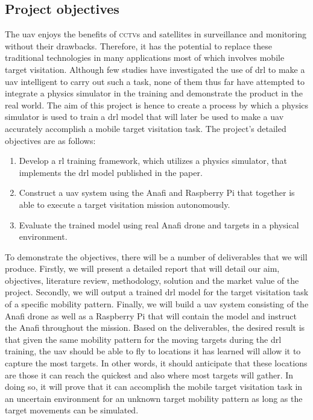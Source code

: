 \documentclass[../main.tex]{subfiles}
\begin{document}

\subsection{Project objectives}\label{sec:objectives}

The \gls{uav} enjoys the benefits of \textsc{cctv}s and satellites
in surveillance and monitoring without their drawbacks.
Therefore, it has the potential to replace these
traditional technologies in many applications 
most of which involves mobile target visitation. 
Although few studies have investigated the use of \gls{drl}
to make a \gls{uav} intelligent to carry out such a task,
none of them thus far have attempted to
integrate a physics simulator in the training
and demonstrate the product in the real world.
The aim of this project is hence to create a process 
by which a physics simulator is used to train 
a \gls{drl} model that will later be used
to make a \gls{uav} accurately accomplish a
mobile target visitation task.
The project's detailed objectives are as follows:

\begin{enumerate}
    \item Develop a \gls{rl} training framework,
        which utilizes a physics simulator, 
        that implements the \gls{drl} model 
        published in the \textcite{Ged21} paper.
    \item Construct a \gls{uav} system using the Anafi and 
        Raspberry Pi that together is able to execute
        a target visitation mission autonomously.
    \item Evaluate the trained model using real Anafi drone
        and targets in a physical environment.
\end{enumerate}

To demonstrate the objectives, there will be a number 
of deliverables that we will produce.
Firstly, we will present a detailed report that will detail
our aim, objectives, literature review, methodology,
solution and the market value of the project.
Secondly, we will output a trained \gls{drl} model for 
the target visitation task of a specific
mobility pattern.
Finally, we will build a \gls{uav} system
consisting of the Anafi drone as well as a Raspberry Pi
that will contain the model and instruct
the Anafi throughout the mission.
Based on the deliverables, the desired result is that
given the same mobility pattern for 
the moving targets during the \gls{drl} training,
the \gls{uav} should be able to fly to locations it has learned
will allow it to capture the most targets. In other words,
it should anticipate that these locations are those it can reach
the quickest and also where most targets will gather.
In doing so, it will prove that it can accomplish 
the mobile target visitation task in an uncertain environment
for an unknown target mobility pattern
as long as the target movements can be simulated.
\end{document}
